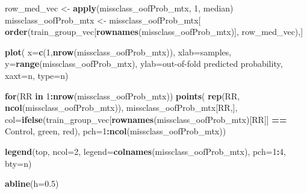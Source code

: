 \documentclass[
]{book}
\newenvironment{Shaded}{\begin{snugshade}}{\end{snugshade}}
\newcommand{\ControlFlowTok}[1]{\textcolor[rgb]{0.13,0.29,0.53}{\textbf{#1}}}
\newcommand{\DataTypeTok}[1]{\textcolor[rgb]{0.13,0.29,0.53}{#1}}
\newcommand{\DecValTok}[1]{\textcolor[rgb]{0.00,0.00,0.81}{#1}}
\newcommand{\FloatTok}[1]{\textcolor[rgb]{0.00,0.00,0.81}{#1}}
\newcommand{\KeywordTok}[1]{\textcolor[rgb]{0.13,0.29,0.53}{\textbf{#1}}}
\newcommand{\NormalTok}[1]{#1}
\newcommand{\OperatorTok}[1]{\textcolor[rgb]{0.81,0.36,0.00}{\textbf{#1}}}
\newcommand{\StringTok}[1]{\textcolor[rgb]{0.31,0.60,0.02}{#1}}
\begin{document}
\begin{Shaded}
\begin{Highlighting}[]
\NormalTok{row\_med\_vec <{-}}\StringTok{ }\KeywordTok{apply}\NormalTok{(missclass\_oofProb\_mtx, }\DecValTok{1}\NormalTok{, median)}
\NormalTok{missclass\_oofProb\_mtx <{-}}\StringTok{ }\NormalTok{missclass\_oofProb\_mtx[}
  \KeywordTok{order}\NormalTok{(train\_group\_vec[}\KeywordTok{rownames}\NormalTok{(missclass\_oofProb\_mtx)], row\_med\_vec),]}

\KeywordTok{plot}\NormalTok{(}
 \DataTypeTok{x=}\KeywordTok{c}\NormalTok{(}\DecValTok{1}\NormalTok{,}\KeywordTok{nrow}\NormalTok{(missclass\_oofProb\_mtx)), }\DataTypeTok{xlab=}\StringTok{\textquotesingle{}samples\textquotesingle{}}\NormalTok{,}
 \DataTypeTok{y=}\KeywordTok{range}\NormalTok{(missclass\_oofProb\_mtx), }\DataTypeTok{ylab=}\StringTok{\textquotesingle{}out{-}of{-}fold predicted probability\textquotesingle{}}\NormalTok{,}
 \DataTypeTok{xaxt=}\StringTok{\textquotesingle{}n\textquotesingle{}}\NormalTok{, }\DataTypeTok{type=}\StringTok{\textquotesingle{}n\textquotesingle{}}\NormalTok{)}

\ControlFlowTok{for}\NormalTok{(RR }\ControlFlowTok{in} \DecValTok{1}\OperatorTok{:}\KeywordTok{nrow}\NormalTok{(missclass\_oofProb\_mtx))}
\KeywordTok{points}\NormalTok{(}
 \KeywordTok{rep}\NormalTok{(RR, }\KeywordTok{ncol}\NormalTok{(missclass\_oofProb\_mtx)), }
\NormalTok{ missclass\_oofProb\_mtx[RR,],}
 \DataTypeTok{col=}\KeywordTok{ifelse}\NormalTok{(train\_group\_vec[}\KeywordTok{rownames}\NormalTok{(missclass\_oofProb\_mtx)[RR]] }\OperatorTok{==}\StringTok{ \textquotesingle{}Control\textquotesingle{}}\NormalTok{,}
  \StringTok{\textquotesingle{}green\textquotesingle{}}\NormalTok{, }\StringTok{\textquotesingle{}red\textquotesingle{}}\NormalTok{),}
 \DataTypeTok{pch=}\DecValTok{1}\OperatorTok{:}\KeywordTok{ncol}\NormalTok{(missclass\_oofProb\_mtx))}

\KeywordTok{legend}\NormalTok{(}\StringTok{\textquotesingle{}top\textquotesingle{}}\NormalTok{, }\DataTypeTok{ncol=}\DecValTok{2}\NormalTok{, }\DataTypeTok{legend=}\KeywordTok{colnames}\NormalTok{(missclass\_oofProb\_mtx), }
 \DataTypeTok{pch=}\DecValTok{1}\OperatorTok{:}\DecValTok{4}\NormalTok{, }\DataTypeTok{bty=}\StringTok{\textquotesingle{}n\textquotesingle{}}\NormalTok{)}

\KeywordTok{abline}\NormalTok{(}\DataTypeTok{h=}\FloatTok{0.5}\NormalTok{)}
\end{Highlighting}
\end{Shaded}
\end{document}
